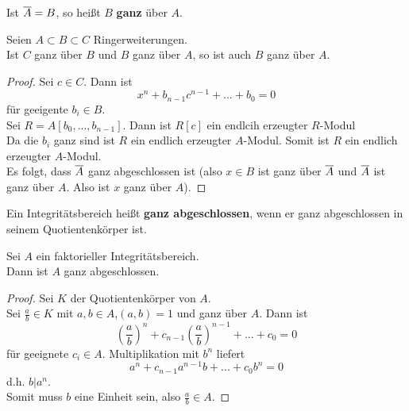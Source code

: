 	\begin{definition}
		Ist $\overline{A}=B$, so heißt $B$ \textbf{ganz} über $A$.
	\end{definition}

	\begin{satz}
		Seien $A\subset B\subset C$ Ringerweiterungen.\\
		Ist $C$ ganz über $B$ und $B$ ganz über $A$, so ist auch $B$ ganz über $A$.
	\end{satz}

	\begin{proof}
		Sei $c\in C$. Dann ist
		\[x^n+b_{n-1}c^{n-1}+...+b_0=0\]
		für geeigente $b_i\in B$.\\
		Sei $R=A[b_0,...,b_{n-1}]$. Dann ist $R[c]$ ein endlcih erzeugter $R$-Modul\\
		Da die $b_i$ ganz sind ist $R$ ein endlich erzeugter $A$-Modul. Somit ist $R$ ein endlich erzeugter $A$-Modul.\\
		Es folgt, dass $\overline{A}$  ganz abgeschlossen ist (also $x\in B$ ist ganz über $\overline{A}$ und $\overline{A}$ ist ganz über $A$. Also ist $x$ ganz über $A$).
	\end{proof}

	\begin{definition}
		Ein Integritätsbereich heißt \textbf{ganz abgeschlossen}, wenn er ganz abgeschlossen in seinem Quotientenkörper ist.
	\end{definition}

	\begin{satz}
		Sei $A$ ein faktorieller Integritätsbereich.\\
		Dann ist $A$ ganz abgeschlossen.
	\end{satz}
	\begin{proof}
		Sei $K$ der Quotientenkörper von $A$.\\
		Sei $\frac{a}{b}\in K$ mit $a,b\in A$,$(a,b)=1$ und ganz über $A$. Dann ist
		\[(\frac{a}{b})^n+c_{n-1}(\frac{a}{b})^{n-1}+...+c_0=0\]
		für geeignete $c_i\in A$.
		Multiplikation mit $b^n$ liefert
		\[a^n+c_{n-1}a^{n-1}b+...+c_0b^n=0\]
		d.h. $b|a^n$.\\
		Somit muss $b$ eine Einheit sein, also $\frac{a}{b}\in A$.
	\end{proof}


